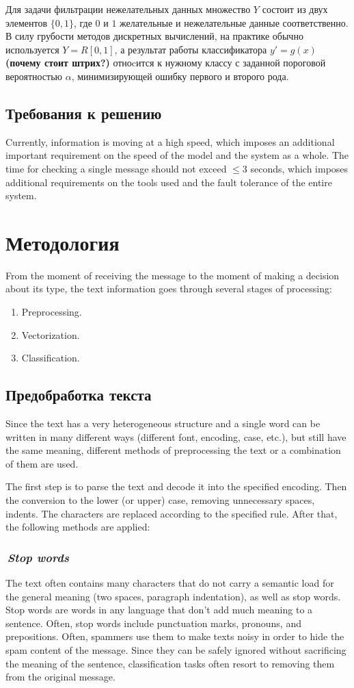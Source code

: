 \documentclass[12pt]{article}
\begin{document}
Для задачи фильтрации нежелательных данных множество $Y$ состоит из двух элементов $\{0, 1\}$, где $0$ и $1$ желательные и нежелательные данные соответственно. В силу грубости методов дискретных вычислений, на практике обычно используется $Y = R[0, 1]$, а результат работы классификатора $y' = g(x)$ {\bf\color{amaranth} (почему стоит штрих?)} отноcится к нужному классу с заданной пороговой вероятностью $\alpha$, минимизирующей ошибку первого и второго рода.

\subsection{Требования к решению}
Currently, information is moving at a high speed, which imposes an additional important requirement on the speed of the model and the system as a whole. The time for checking a single message should not exceed $\leqslant3$ seconds, which imposes additional requirements on the tools used and the fault tolerance of the entire system.

\section{Методология}

From the moment of receiving the message to the moment of making a decision about its type, the text information goes through several stages of processing:
\begin{enumerate}
\item Preprocessing.
\item Vectorization.
\item Classification.
\end{enumerate}

\subsection{Предобработка текста}
Since the text has a very heterogeneous structure and a single word can be written in many different ways (different font, encoding, case, etc.), but still have the same meaning, different methods of preprocessing the text or a combination of them are used.

The first step is to parse the text and decode it into the specified encoding. Then the conversion to the lower (or upper) case, removing unnecessary spaces, indents. The characters are replaced according to the specified rule. After that, the following methods are applied:

\subsubsection*{\it\,Stop words}
The text often contains many characters that do not carry a semantic load for the general meaning (two spaces, paragraph indentation), as well as stop words.
Stop words are words in any language that don't add much meaning to a sentence. Often, stop words include punctuation marks, pronouns, and prepositions. Often, spammers use them to make texts noisy in order to hide the spam content of the message. Since they can be safely ignored without sacrificing the meaning of the sentence, classification tasks often resort to removing them from the original message.
\end{document}
